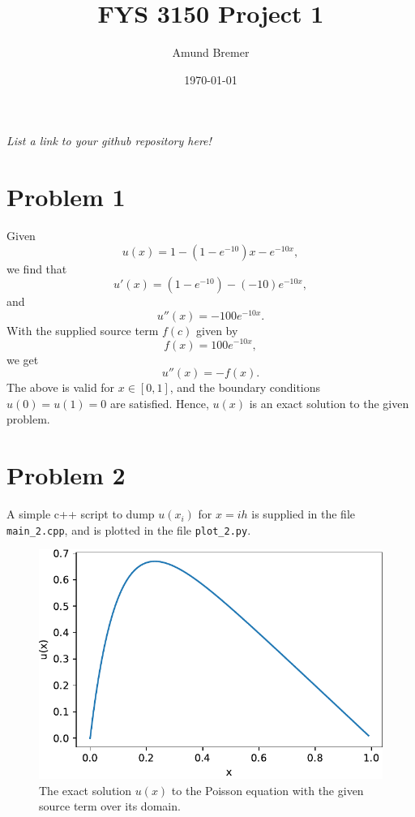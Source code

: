 \documentclass[english,notitlepage]{revtex4}  %
\begin{document}
\title{FYS 3150 Project 1}      %
\author{Amund Bremer}          %
\date{\today}                             %

\noaffiliation                            %


\maketitle   
\textit{List a link to your github repository here!}
    
\section*{Problem 1}
Given
\begin{equation*}
    u(x) = 1 - (1 - e^{-10}) x - e^{-10 x},
\end{equation*}
we find that
\begin{equation*}
    u'(x) = (1 - e^{-10})  - (-10) e^{-10 x},
\end{equation*}
and
\begin{equation*}
    u''(x) =  -100 e^{-10 x}.
\end{equation*}
With the supplied source term $f(c)$ given by
\begin{equation*}
    f(x) = 100  e^{-10 x},
\end{equation*}
we get 
\begin{equation*}
    u''(x) =  -f(x).
\end{equation*}
The above is valid for $x \in [0, 1]$, and the boundary conditions $u(0) = u(1) = 0$ are satisfied. Hence, $u(x)$ is an 
exact solution to the given problem.
%
\section*{Problem 2}
A simple c++ script to dump $u(x_i)$ for $x = ih$ is supplied in the file \texttt{main\_2.cpp}, and is plotted in the file 
\texttt{plot\_2.py}. 
\begin{figure}%
    \centering %
    \includegraphics{figs/problem_2.pdf} %
    \caption{The exact solution $u(x)$ to the Poisson equation with the given source term over its domain.}
    \label{fig:exact}
\end{figure}
%
\end{document}
